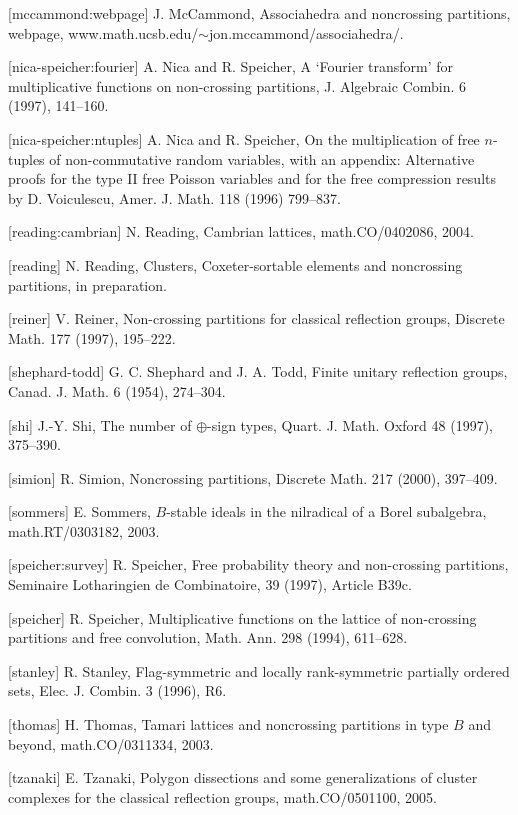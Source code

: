 \documentclass[12pt,letterpaper, reqno]{amsart}
\begin{document}
[mccammond:webpage]
J. McCammond, Associahedra and noncrossing partitions, webpage, www.math.ucsb.edu/$\sim$jon.mccammond/associahedra/.

[nica-speicher:fourier]
A. Nica and R. Speicher, A `Fourier transform' for multiplicative functions on non-crossing partitions, J. Algebraic Combin. {6} (1997), 141--160.

[nica-speicher:ntuples]
A. Nica and R. Speicher, On the multiplication of free $n$-tuples of non-commutative random variables, with an appendix: Alternative proofs for the type II free Poisson variables and for the free compression results by D. Voiculescu, Amer. J. Math. {118} (1996) 799--837.

[reading:cambrian]
N. Reading, Cambrian lattices, math.CO/0402086, 2004.

[reading]
N. Reading, Clusters, Coxeter-sortable elements and noncrossing partitions, in preparation.

[reiner]
V. Reiner, Non-crossing partitions for classical reflection groups, Discrete Math. {177} (1997), 195--222.

[shephard-todd]
G. C. Shephard and J. A. Todd, Finite unitary reflection groups, Canad. J. Math. {6} (1954), 274--304.

[shi]
J.-Y. Shi, The number of $\oplus$-sign types, Quart. J. Math. Oxford {48} (1997), 375--390.

[simion]
R. Simion, Noncrossing partitions, Discrete Math. {217} (2000), 397--409.

[sommers]
E. Sommers, $B$-stable ideals in the nilradical of a Borel subalgebra, math.RT/0303182, 2003.

[speicher:survey]
R. Speicher, Free probability theory and non-crossing partitions, Seminaire Lotharingien de Combinatoire, {39} (1997), Article B39c.

[speicher]
R. Speicher, Multiplicative functions on the lattice of non-crossing partitions and free convolution, Math. Ann. {298} (1994), 611--628.

[stanley]
R. Stanley, Flag-symmetric and locally rank-symmetric partially ordered sets, Elec. J. Combin. {3} (1996), R6.

[thomas]
H. Thomas, Tamari lattices and noncrossing partitions in type $B$ and beyond, math.CO/0311334, 2003.

[tzanaki]
E. Tzanaki, Polygon dissections and some generalizations of cluster complexes for the classical reflection groups, math.CO/0501100, 2005.
\end{document}
